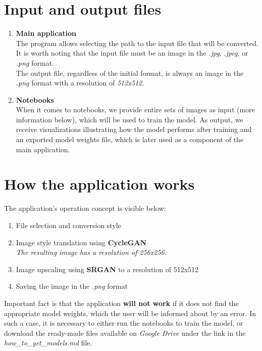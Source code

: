 \documentclass{article}
\begin{document}
\section{Input and output files}
\begin{enumerate}[label=\arabic*.]
    \item \textbf{Main application} \\
The program allows selecting the path to the input file that will be converted. It is worth noting that the input file must be an image in the \textit{.jpg}, \textit{.jpeg}, or \textit{.png} format.
\vspace{3mm} \\
The output file, regardless of the initial format, is always an image in the \textit{.png} format with a resolution of \textit{512x512}.
    \item \textbf{Notebooks} \\
When it comes to notebooks, we provide entire sets of images as input (more information below), which will be used to train the model. As output, we receive visualizations illustrating how the model performs after training and an exported model weights file, which is later used as a component of the main application.
\end{enumerate}

\section{How the application works}
The application's operation concept is visible below:
\begin{enumerate}[label=\arabic*.]
    \item File selection and conversion style
    \item Image style translation using \textbf{CycleGAN} \\
\textit{The resulting image has a resolution of 256x256.}
    \item Image upscaling using \textbf{SRGAN} to a resolution of 512x512
    \item Saving the image in the \textit{.png} format
\end{enumerate}
Important fact is that the application \textbf{will not work} if it does not find the appropriate model weights, which the user will be informed about by an error.
In such a case, it is necessary to either run the notebooks to train the model, or download the ready-made files available on \textit{Google Drive} under the link in the \textit{how\_to\_get\_models.md} file.
\end{document}
